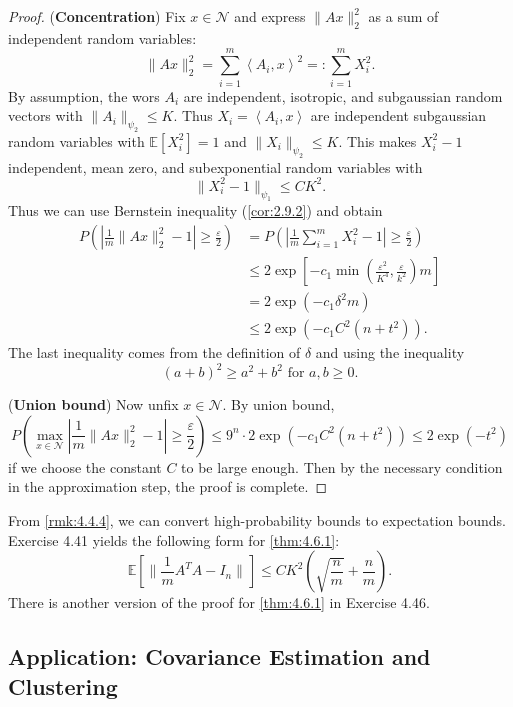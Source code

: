 \begin{proof}
(\textbf{Concentration}) Fix $x \in \mathcal{N}$ and express $\lVert Ax \rVert_{2}^2$ as a sum of 
independent random variables: 
\[ \lVert Ax \rVert_{2}^2 = \sum_{i = 1}^{m} \left\langle A_i, x \right\rangle^2 =: \sum_{i = 1}^{m} X_i^2. \]
By assumption, the wors $A_i$ are independent, isotropic, and subgaussian random vectors with 
$\lVert A_i \rVert_{\psi_2} \leq K$. Thus $X_i = \left\langle A_i, x \right\rangle$ are independent subgaussian 
random variables with $\mathbb{E}[X_i^2] = 1$ and $\lVert X_i \rVert_{\psi_2} \leq K$. This makes 
$X_i^2 - 1$ independent, mean zero, and subexponential random variables with 
\[ \lVert X_i^2 - 1 \rVert_{\psi_1} \leq CK^2. \]
Thus we can use Bernstein inequality (\cref{cor:2.9.2}) and obtain 
\begin{align*}
	P \left( \left| \frac{1}{m}\lVert Ax \rVert_{2}^2 - 1 \right| \geq \frac{\varepsilon}{2} \right) 
	&= P \left( \left| \frac{1}{m} \sum_{i = 1}^{m} X_i^2 - 1 \right| \geq \frac{\varepsilon}{2} \right) \\
	&\leq 2 \exp{\left[ -c_1 \min_{}\left( \frac{\varepsilon^2}{K^4}, \frac{\varepsilon}{k^2} 
	\right)m \right]} \\
	&= 2 \exp{(-c_1 \delta^2 m)} \\
	&\leq 2 \exp{(-c_1 C^2(n + t^2))}.
\end{align*}
The last inequality comes from the definition of $\delta$ and using the inequality 
\[ (a + b)^2 \geq a^2 + b^2 \text{ for } a, b \geq 0. \]

(\textbf{Union bound}) Now unfix $x \in \mathcal{N}$. By union bound, 
\[ P \left( \max_{x \in \mathcal{N}} \left| \frac{1}{m}\lVert Ax \rVert_{2}^2 - 1 \right| 
\geq \frac{\varepsilon}{2} \right) 
\leq 9^n \cdot 2 \exp{(-c_1 C^2(n + t^2))} \leq 2 \exp{(-t^2)} \]
if we choose the constant $C$ to be large enough. Then by the necessary condition in the approximation step, 
the proof is complete.
\end{proof}

\begin{remark}
\label{rmk:4.6.2}
From \cref{rmk:4.4.4}, we can convert high-probability bounds to expectation bounds. Exercise 4.41 yields the 
following form for \cref{thm:4.6.1}:
\[ \mathbb{E}\left[ \lVert \frac{1}{m}A^T A - I_n \rVert_{} \right] \leq 
CK^2 \left( \sqrt{\frac{n}{m}} + \frac{n}{m} \right). \]
There is another version of the proof for \cref{thm:4.6.1} in Exercise 4.46.
\end{remark}



\subsection{Application: Covariance Estimation and Clustering}
